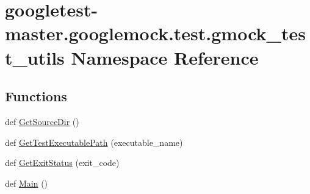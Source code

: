 \hypertarget{namespacegoogletest-master_1_1googlemock_1_1test_1_1gmock__test__utils}{}\section{googletest-\/master.googlemock.\+test.\+gmock\+\_\+test\+\_\+utils Namespace Reference}
\label{namespacegoogletest-master_1_1googlemock_1_1test_1_1gmock__test__utils}
\subsection*{Functions}
\begin{DoxyCompactItemize}
\item 
def \mbox{\hyperlink{namespacegoogletest-master_1_1googlemock_1_1test_1_1gmock__test__utils_aa53045749b50257c5ffcbbb33d7a28b9}{Get\+Source\+Dir}} ()
\item 
def \mbox{\hyperlink{namespacegoogletest-master_1_1googlemock_1_1test_1_1gmock__test__utils_a96f12a02ddad3510eb506e45a7aeb27b}{Get\+Test\+Executable\+Path}} (executable\+\_\+name)
\item 
def \mbox{\hyperlink{namespacegoogletest-master_1_1googlemock_1_1test_1_1gmock__test__utils_abc18127285188c1521e883b493486e11}{Get\+Exit\+Status}} (exit\+\_\+code)
\item 
def \mbox{\hyperlink{namespacegoogletest-master_1_1googlemock_1_1test_1_1gmock__test__utils_a66f3908daa336c8cc507730bcd64bb5f}{Main}} ()
\end{DoxyCompactItemize}
